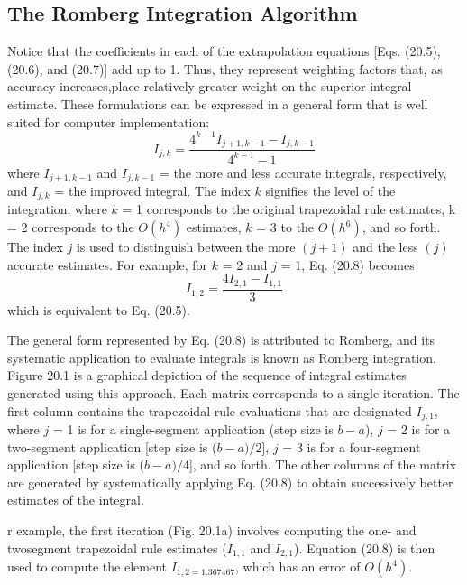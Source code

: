 \documentclass[../main.tex]{subfiles}
\begin{document}
\subsection{ The Romberg Integration Algorithm}
Notice that the coefficients in each of the extrapolation equations [Eqs. (20.5), (20.6), and
(20.7)] add up to 1. Thus, they represent weighting factors that, as accuracy increases,place relatively greater weight on the superior integral estimate. These formulations can be
expressed in a general form that is well suited for computer implementation:
\begin{equation}
	\tag{20.8}
	I_{j,k}=\dfrac{4^{k-1}I_{j+1,k-1}-I_{j,k-1}}{4^{k-1}-1}
\end{equation}
where $I_{j+1,k−1}$ and $I_{j,k−1}$ = the more and less accurate integrals, respectively, and $I_{j,k}$ =
the improved integral. The index $k$ signifies the level of the integration, where $k$ = 1 corresponds to the original trapezoidal rule estimates, k = 2 corresponds to the $O(h^4)$ estimates, $k$ = 3 to the $O(h^6)$, and so forth. The index $j$ is used to distinguish between the more
$(j + 1)$ and the less $(j)$ accurate estimates. For example, for $k$ = 2 and $j$ = 1, Eq. (20.8)
becomes
\begin{equation}
	I_{1,2}=\dfrac{4I_{2,1}-I_{1,1}}{3}
\end{equation}
which is equivalent to Eq. (20.5).
\vspace{0.5 in}

The general form represented by Eq. (20.8) is attributed to Romberg, and its systematic application to evaluate integrals is known as Romberg integration. Figure 20.1 is a
graphical depiction of the sequence of integral estimates generated using this approach.
Each matrix corresponds to a single iteration. The first column contains the trapezoidal rule
evaluations that are designated $I_{j,1}$, where $j$ = 1 is for a single-segment application (step
size is $b − a$), $j$ = 2 is for a two-segment application [step size is ($b − a)/2$], $j$ = 3 is for
a four-segment application [step size is ($b − a)/4$], and so forth. The other columns of the
matrix are generated by systematically applying Eq. (20.8) to obtain successively better
estimates of the integral.

r example, the first iteration (Fig. 20.1a) involves computing the one- and twosegment trapezoidal rule estimates ($I_{1,1}$ and $I_{2,1}$). Equation (20.8) is then used to compute
the element $I_{1,2 = 1.367467}$, which has an error of $O(h^4)$.
\end{document}
